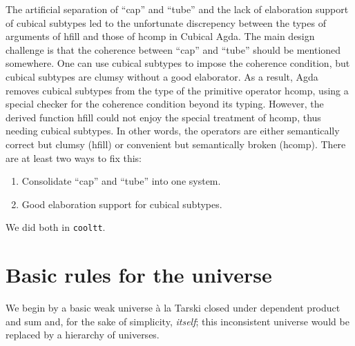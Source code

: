 \documentclass[draft]{amsart}
\begin{document}
\begin{remark}
  The artificial separation of ``cap'' and ``tube'' and the lack of elaboration support of cubical subtypes led to the unfortunate discrepency between the types of arguments of \textsf{hfill} and those of \textsf{hcomp} in Cubical Agda. The main design challenge is that the coherence between ``cap'' and ``tube'' should be mentioned somewhere. One can use cubical subtypes to impose the coherence condition, but cubical subtypes are clumsy without a good elaborator. As a result, Agda removes cubical subtypes from the type of the primitive operator \textsf{hcomp}, using a special checker for the coherence condition beyond its typing. However, the derived function \textsf{hfill} could not enjoy the special treatment of \textsf{hcomp}, thus needing cubical subtypes. In other words, the operators are either semantically correct but clumsy (\textsf{hfill}) or convenient but semantically broken (\textsf{hcomp}). There are at least two ways to fix this:
  \begin{enumerate}
    \item Consolidate ``cap'' and ``tube'' into one system.
    \item Good elaboration support for cubical subtypes.
  \end{enumerate}
  We did both in \texttt{cooltt}.
\end{remark}

\section{Basic rules for the universe}

We begin by a basic weak universe \`a la Tarski closed under dependent product
and sum and, for the sake of simplicity, \emph{itself}; this inconsistent
universe would be replaced by a hierarchy of universes.

\end{document}
